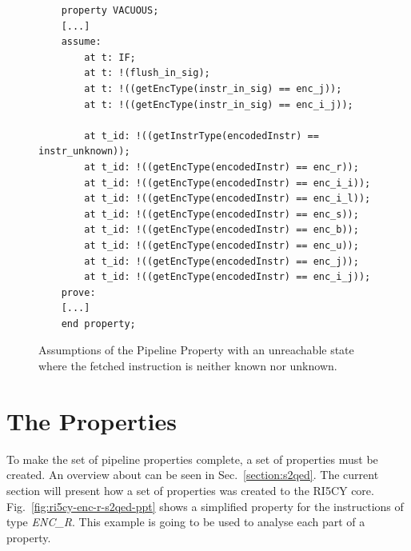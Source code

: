 \begin{figure}[htb!]
    \begin{lstlisting}
    property VACUOUS;
    [...]
    assume:
        at t: IF;
        at t: !(flush_in_sig);
        at t: !((getEncType(instr_in_sig) == enc_j));
        at t: !((getEncType(instr_in_sig) == enc_i_j));
        
        at t_id: !((getInstrType(encodedInstr) == instr_unknown));
        at t_id: !((getEncType(encodedInstr) == enc_r));
        at t_id: !((getEncType(encodedInstr) == enc_i_i));
        at t_id: !((getEncType(encodedInstr) == enc_i_l));
        at t_id: !((getEncType(encodedInstr) == enc_s));
        at t_id: !((getEncType(encodedInstr) == enc_b));
        at t_id: !((getEncType(encodedInstr) == enc_u));
        at t_id: !((getEncType(encodedInstr) == enc_j));
        at t_id: !((getEncType(encodedInstr) == enc_i_j));
    prove:
    [...]
    end property;\end{lstlisting}
    \caption{Assumptions of the Pipeline Property with an unreachable state where the fetched instruction is neither known nor unknown.}
    \label{fig:ri5cy-vacuous-ppt}
\end{figure}

\section{The \SSQED{} Properties}
\label{section:ri5cy-s2qed-ppt}

To make the set of pipeline properties complete, a set of \SSQED{} properties must be created. An overview about \SSQED{} can be seen in Sec.~\ref{section:s2qed}. The current section will present how a set of \SSQED{} properties was created to the RI5CY core.  Fig.~\ref{fig:ri5cy-enc-r-s2qed-ppt} shows a simplified \SSQED{} property for the instructions of type \textit{ENC\_R}. This example is going to be used to analyse each part of a \SSQED{} property.

